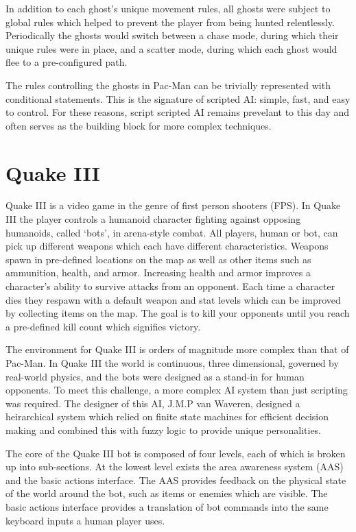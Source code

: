 In addition to each ghost's unique movement rules, all ghosts were subject to global rules which helped to prevent the player from being hunted relentlessly. Periodically the ghosts would switch between a chase mode, during which their unique rules were in place, and a scatter mode, during which each ghost would flee to a pre-configured path.

The rules controlling the ghosts in Pac-Man can be trivially represented with conditional statements. This is the signature of scripted AI: simple, fast, and easy to control. For these reasons, script scripted AI remains prevelant to this day and often serves as the building block for more complex techniques.

\section{Quake III}

Quake III is a video game in the genre of first person shooters (FPS). In Quake III the player controls a humanoid character fighting against opposing humanoids, called `bots', in arena-style combat. All players, human or bot, can pick up different weapons which each have different characteristics. Weapons spawn in pre-defined locations on the map as well as other items such as ammunition, health, and armor. Increasing health and armor improves a character's ability to survive attacks from an opponent. Each time a character dies they respawn with a default weapon and stat levels which can be improved by collecting items on the map. The goal is to kill your opponents until you reach a pre-defined kill count which signifies victory. 

The environment for Quake III is orders of magnitude more complex than that of Pac-Man. In Quake III the world is continuous, three dimensional, governed by real-world physics, and the bots were designed as a stand-in for human opponents. To meet this challenge, a more complex AI system than just scripting was required. The designer of this AI, J.M.P van Waveren, designed a heirarchical system which relied on finite state machines for efficient decision making and combined this with fuzzy logic to provide unique personalities. \cite{q3bot}

The core of the Quake III bot is composed of four levels, each of which is broken up into sub-sections. At the lowest level exists the area awareness system (AAS) and the basic actions interface. The AAS provides feedback on the physical state of the world around the bot, such as items or enemies which are visible. The basic actions interface provides a translation of bot commands into the same keyboard inputs a human player uses.

